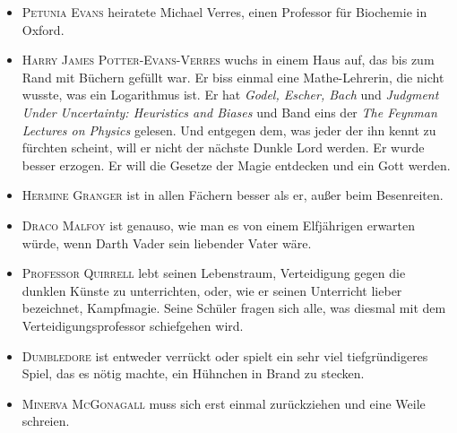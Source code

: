 \begin{itemize}
\item \textsc{Petunia Evans} heiratete Michael Verres, einen Professor für Biochemie in Oxford.
\item \textsc{Harry James Potter-Evans-Verres} wuchs in einem Haus auf, das bis zum Rand mit Büchern gefüllt war. Er biss einmal eine Mathe-Lehrerin, die nicht wusste, was ein Logarithmus ist. Er hat \emph{Godel, Escher, Bach} und \emph{Judgment Under Uncertainty: Heuristics and Biases} und Band eins der \emph{The Feynman Lectures on Physics} gelesen. Und entgegen dem, was jeder der ihn kennt zu fürchten scheint, will er nicht der nächste Dunkle Lord werden. Er wurde besser erzogen. Er will die Gesetze der Magie entdecken und ein Gott werden.
\item \textsc{Hermine Granger} ist in allen Fächern besser als er, außer beim Besenreiten.
\item \textsc{Draco Malfoy} ist genauso, wie man es von einem Elfjährigen erwarten würde, wenn Darth Vader sein liebender Vater wäre.
\item \textsc{Professor Quirrell} lebt seinen Lebenstraum, Verteidigung gegen die dunklen Künste zu unterrichten, oder, wie er seinen Unterricht lieber bezeichnet, Kampfmagie. Seine Schüler fragen sich alle, was diesmal mit dem Verteidigungsprofessor schiefgehen wird.
\item \textsc{Dumbledore} ist entweder verrückt oder spielt ein sehr viel tiefgründigeres Spiel, das es nötig machte, ein Hühnchen in Brand zu stecken.
\item \textsc{Minerva McGonagall} muss sich erst einmal zurückziehen und eine Weile schreien.
\end{itemize}

